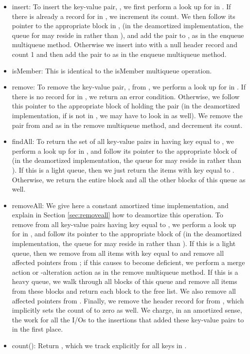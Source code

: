 \documentclass[11pt,letterpaper]{article}
\newcommand{\eat}[1]{}
\begin{document}
\begin{itemize}
\item
insert: To insert the key-value pair, ,
we first perform a look up for  in .
If there is already a record for  in , we increment its count. We
 then follow its pointer to the appropriate block  in , (in the deamortized implementation,
the queue for  may reside in  rather than ),
and add the pair  to , as in the enqueue multiqueue method.
Otherwise we insert  into  with a null header record and count 1 and then add the pair  
to  as in the enqueue multiqueue method.
\item
isMember: This is identical to the isMember multiqueue operation. \eat{We do a look up in  to determine whether the key-value pair
 exists as a record in , and return 
a Boolean value encoding the success or failure of this
look up.} 
\item
remove: To remove the key-value pair, , from ,
we perform a look up for  in . If there is no record for  in , we
return an error condition. Otherwise, we follow this pointer
to the appropriate block  of  holding the pair  (in the deamortized implementation,
if  is not in , we may have to look in  as well).
We remove the pair  from  and  as in the remove multiqueue method, and decrement its count.
\item
findAll: To return the set of all key-value pairs
in  having key equal to , we perform a look up for  in ,
and follow its pointer to the appropriate block of  (in the deamortized implementation,
the queue for  may reside in  rather than ). If this
is a light queue, then we just return the items with key equal to
.
Otherwise, we return the entire block and all the other blocks of
this queue as well.
\item
removeAll: We give here a constant amortized time implementation, and explain
in Section \ref{sec:removeall} how to deamortize this operation. To remove from  all key-value pairs
having key equal to , we perform a look up for  in ,
and follow its pointer to the appropriate block  of  (in the deamortized implementation,
the queue for  may reside in  rather than ). If this
is a light queue, then we remove from  all items with key equal to
 and remove all affected pointers from ; if this causes  to become deficient, we 
perform a merge action or -alteration action as in the remove multiqueue method. If
this is a heavy queue, we walk through all blocks of this queue and remove all items from these blocks and
return each block to the free list. We also remove all affected pointers from . 
Finally, we remove the header record for  from , which implicitly sets the count of  to zero as well. We charge, in an amortized sense,
the work for all the I/Os to the insertions that added these
key-value pairs to  in the first place.
\item count(): Return , which we track explicitly for all keys  in .
\end{itemize}
\end{document}
